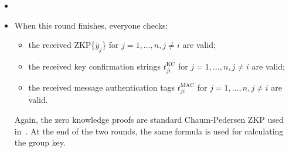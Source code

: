 \begin{itemize}
    \item[]
    \item[] When this round finishes, everyone checks:
        \begin{itemize}
            \item the received ZKP\{$\tilde{y_j}$\} for $j = 1,\ldots, n, j\neq i$ are valid;
            \item the received key confirmation strings $t^{\text{KC}}_{ji}$ for $j = 1,\ldots, n, j\neq i$ are valid;
            \item the received message authentication tags $t^{\text{MAC}}_{ji}$ for $j = 1,\ldots, n, j\neq i$ are valid.
        \end{itemize}
        Again, the zero knowledge proofs are standard Chaum-Pedersen ZKP used in~\cite{HaYiChSh15}. At the end of the two rounds, the same
        formula is used for calculating the group key. 
\end{itemize}

